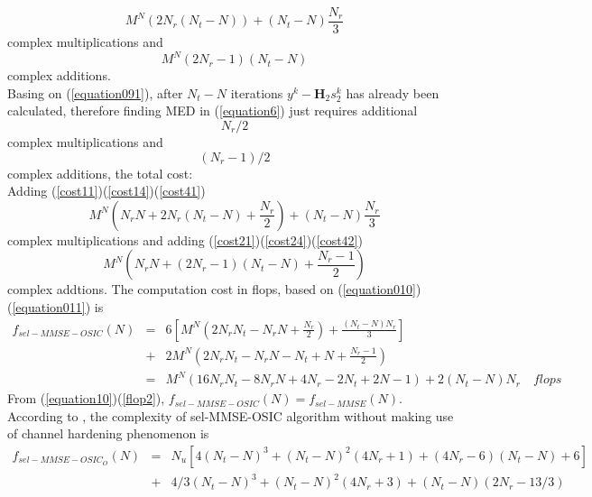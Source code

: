 \documentclass[12pt,a4paper,final]{article}
\begin{document}
\begin{spacing}{2.5}
\begin{equation}
M^{N}(2N_{r}(N_{t}-N))+(N_{t}-N)\frac{N_{r}}{3}\label{cost14}
\end{equation} 
complex multiplications and
\begin{equation}
M^{N}(2N_{r}-1)(N_{t}-N)\label{cost24}
\end{equation}
complex additions.\\
Basing on (\ref{equation091}), after $N_{t}-N$ iterations $y^{k}-\mathbf{H}_{2}s_{2}^{k}$ has already been calculated, therefore finding MED in (\ref{equation6}) just requires additional 
\begin{equation}
N_{r}/2     \label{cost41}
\end{equation}
complex multiplications and 
\begin{equation}
(N_{r}-1)/2  \label{cost42}
\end{equation}
complex additions, the total cost:\\
Adding (\ref{cost11})(\ref{cost14})(\ref{cost41})
\begin{equation}
M^{N}(N_{r}N+2N_{r}(N_{t}-N)+\frac{N_{r}}{2})+(N_{t}-N)\frac{N_{r}}{3}\label{equation010}
\end{equation}
complex multiplications and adding (\ref{cost21})(\ref{cost24})(\ref{cost42})
\begin{equation}
M^{N}(N_{r}N+(2N_{r}-1)(N_{t}-N)+\frac{N_{r}-1}{2})\label{equation011}
\end{equation}
complex addtions.
The computation cost in flops, based on (\ref{equation010})(\ref{equation011}) is
\begin{eqnarray}
f_{sel-MMSE-OSIC}(N) &=& 6[M^{N}(2N_{r}N_{t}-N_{r}N+\frac{N_r}{2})+\frac{(N_{t}-N)N_r}{3}]\\  
&+&2M^{N}(2N_{r}N_{t}-N_{r}N-N_{t}+N+\frac{N_{r}-1}{2})\\
\nonumber 
&=&M^{N}(16N_{r}N_{t}-8N_{r}N+4N_{r}-2N_{t}+2N-1)+2(N_{t}-N)N_{r}\quad flops\label{flop2}
\end{eqnarray}
From (\ref{equation10})(\ref{flop2}), $f_{sel-MMSE-OSIC}(N)=f_{sel-MMSE}(N)$.\\
According to \cite{2}, the complexity of sel-MMSE-OSIC algorithm without making use of channel hardening phenomenon is 
\begin{eqnarray}
\nonumber
f_{sel-MMSE-OSIC_{O}}(N)&=& N_u[4(N_{t}-N)^{3}+(N_{t}-N)^{2}(4N_{r}+1)+(4N_{r}-6)(N_{t}-N)+6]\\
\nonumber
&+&4/3(N_{t}-N)^{3}+(N_{t}-N)^{2}(4N_{r}+3)+(N_{t}-N)(2N_{r}-13/3)\\

\end{eqnarray}
\end{spacing}
\end{document}
